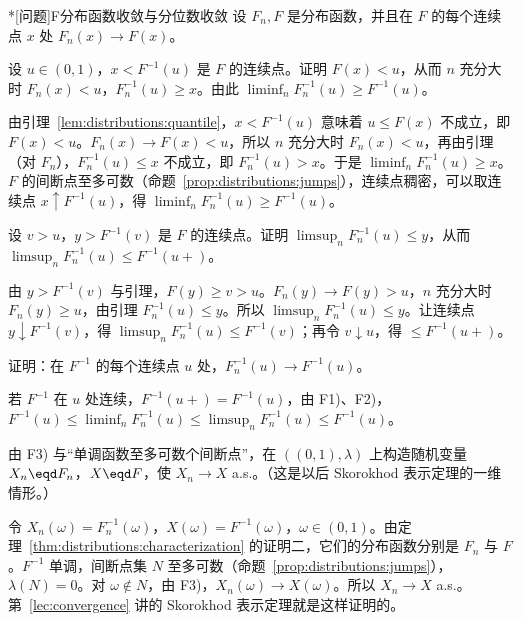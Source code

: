 \begin{probleme}*[问题]{F}{分布函数收敛与分位数收敛}
设 $F_n,F$ 是分布函数，并且在 $F$ 的每个连续点 $x$ 处 $F_n(x)\to F(x)$。
\begin{questions}
\item 设 $u\in(0,1)$，$x<F^{-1}(u)$ 是 $F$ 的连续点。证明 $F(x)<u$，从而 $n$ 充分大时 $F_n(x)<u$，$F_n^{-1}(u)\geqslant x$。由此 $\liminf_nF_n^{-1}(u)\geqslant F^{-1}(u)$。
\begin{solution}
由引理~\ref{lem:distributions:quantile}，$x<F^{-1}(u)$ 意味着 $u\leqslant F(x)$ 不成立，即 $F(x)<u$。$F_n(x)\to F(x)<u$，所以 $n$ 充分大时 $F_n(x)<u$，再由引理（对 $F_n$），$F_n^{-1}(u)\leqslant x$ 不成立，即 $F_n^{-1}(u)>x$。于是 $\liminf_nF_n^{-1}(u)\geqslant x$。$F$ 的间断点至多可数（命题~\ref{prop:distributions:jumps}），连续点稠密，可以取连续点 $x\uparrow F^{-1}(u)$，得 $\liminf_nF_n^{-1}(u)\geqslant F^{-1}(u)$。
\end{solution}
\item 设 $v>u$，$y>F^{-1}(v)$ 是 $F$ 的连续点。证明 $\limsup_nF_n^{-1}(u)\leqslant y$，从而 $\limsup_nF_n^{-1}(u)\leqslant F^{-1}(u+)$。
\begin{solution}
由 $y>F^{-1}(v)$ 与引理，$F(y)\geqslant v>u$。$F_n(y)\to F(y)>u$，$n$ 充分大时 $F_n(y)\geqslant u$，由引理 $F_n^{-1}(u)\leqslant y$。所以 $\limsup_nF_n^{-1}(u)\leqslant y$。让连续点 $y\downarrow F^{-1}(v)$，得 $\limsup_nF_n^{-1}(u)\leqslant F^{-1}(v)$；再令 $v\downarrow u$，得 $\leqslant F^{-1}(u+)$。
\end{solution}
\item 证明：在 $F^{-1}$ 的每个连续点 $u$ 处，$F_n^{-1}(u)\to F^{-1}(u)$。
\begin{solution}
若 $F^{-1}$ 在 $u$ 处连续，$F^{-1}(u+)=F^{-1}(u)$，由 F1)、F2)，$F^{-1}(u)\leqslant\liminf_nF_n^{-1}(u)\leqslant\limsup_nF_n^{-1}(u)\leqslant F^{-1}(u)$。
\end{solution}
\item 由 F3) 与“单调函数至多可数个间断点”，在 $((0,1),\lambda)$ 上构造随机变量 $X_n\eqd F_n$，$X\eqd F$，使 $X_n\to X$ a.s.。（这是以后 Skorokhod 表示定理的一维情形。）
\begin{solution}
令 $X_n(\omega)=F_n^{-1}(\omega)$，$X(\omega)=F^{-1}(\omega)$，$\omega\in(0,1)$。由定理~\ref{thm:distributions:characterization} 的证明二，它们的分布函数分别是 $F_n$ 与 $F$。$F^{-1}$ 单调，间断点集 $N$ 至多可数（命题~\ref{prop:distributions:jumps}），$\lambda(N)=0$。对 $\omega\notin N$，由 F3)，$X_n(\omega)\to X(\omega)$。所以 $X_n\to X$ a.s.。第~\ref{lec:convergence} 讲的 Skorokhod 表示定理就是这样证明的。
\end{solution}
\end{questions}
\end{probleme}

